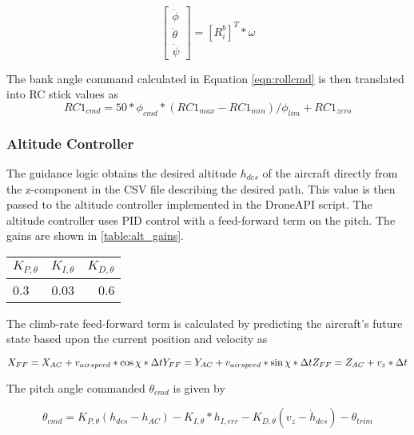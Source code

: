 \documentclass{aiaa}
\begin{document}
\begin{equation}
	\begin{bmatrix}
    \dot{\phi}\\
    \dot{\theta}\\
    \dot{\psi}
    \end{bmatrix}
    =[R_i^b]^T*\omega
\end{equation}

The bank angle command calculated in Equation \eqref{eqn:rollcmd} is then translated into RC stick values as
\begin{equation}
RC1_{cmd} = 50*\phi_{cmd}*(RC1_{max} - RC1_{min})/\phi_{lim} + RC1_{zero}
\end{equation}

\subsubsection{Altitude Controller}

The guidance logic obtains the desired altitude $h_{des}$ of the aircraft directly from the z-component in the CSV file describing the desired path. This value is then passed to the altitude controller implemented in the DroneAPI script. The altitude controller uses PID control with a feed-forward term on the pitch. The gains are shown in \ref{table:alt_gains}.
\begin{center}
\begin{tabular}{ l| c | r}
\label{table:alt_gains}
	
    $K_{P,\theta}$ & $K_{I,\theta}$ & $K_{D,\theta}$ \\
    \hline \hline
    0.3 & 0.03 & 0.6 \\
    \hline


\end{tabular}
\end{center}
The climb-rate feed-forward term is calculated by predicting the aircraft's future state based upon the current position and velocity as

\begin{equation}
X_{FF} = X_{AC} + v_{airspeed}*\cos{\chi}*\Delta t
\newline
Y_{FF} = Y_{AC} + v_{airspeed}*\sin{\chi}*\Delta t
\newline
Z_{FF} = Z_{AC} + v_z*\Delta t
\end{equation}

The pitch angle commanded $\theta_{cmd}$ is given by

\begin{equation} \theta_{cmd} = K_{P,\theta}(h_{des} - h_{AC}) - K_{I,\theta}*h_{I,err} - K_{D,\theta}(v_z - \dot{h}_{des}) - \theta_{trim}
\end{equation}
\end{document}
